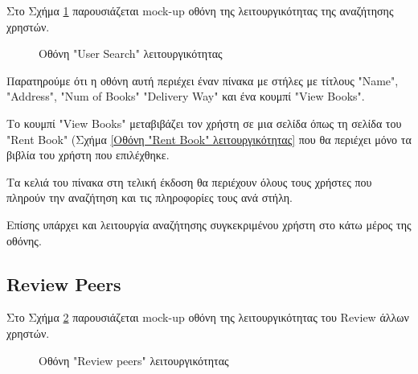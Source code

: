 \documentclass[12pt,a4paper]{article}
\begin{document}
Στο Σχήμα \ref{Οθόνη "User Search" λειτουργικότητας} παρουσιάζεται mock-up οθόνη της λειτουργικότητας της αναζήτησης χρηστών.

\begin{figure}[H]
	\caption{Οθόνη "User Search" λειτουργικότητας}
	\label{Οθόνη "User Search" λειτουργικότητας}
\end{figure}

Παρατηρούμε ότι η οθόνη αυτή περιέχει έναν πίνακα με στήλες με τίτλους "Name", "Address", "Num of Books" "Delivery Way" και ένα κουμπί "View Books". 

Το κουμπί "View Books" μεταβιβάζει τον χρήστη σε μια σελίδα όπως τη σελίδα του "Rent Book" (Σχήμα \ref{Οθόνη "Rent Book" λειτουργικότητας} που θα περιέχει μόνο τα βιβλία του χρήστη που επιλέχθηκε.

Τα κελιά του πίνακα στη τελική έκδοση θα περιέχουν όλους τους χρήστες που πληρούν την αναζήτηση και τις πληροφορίες τους ανά στήλη.

Επίσης υπάρχει και λειτουργία αναζήτησης συγκεκριμένου χρήστη στο κάτω μέρος της οθόνης.

\subsection{Review Peers}

Στο Σχήμα \ref{Οθόνη "Review peers" λειτουργικότητας} παρουσιάζεται mock-up οθόνη της λειτουργικότητας του Review άλλων χρηστών.

\begin{figure}[H]
	\caption{Οθόνη "Review peers" λειτουργικότητας}
	\label{Οθόνη "Review peers" λειτουργικότητας}
\end{figure}
\end{document}
